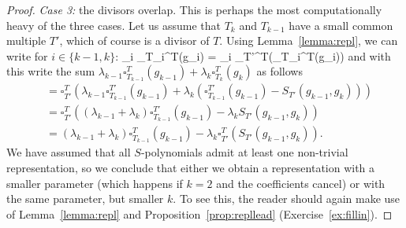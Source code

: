 \documentclass[fleqn, a4paper, twoside]{article}
\makeatletter
\newcommand{\repl}[3]{\square_{#1}^{#2}(#3)}
\newcommand{\0}{\langle 0\rangle}
\let\[\@undefined
\DeclareRobustCommand{\[}{\begin{equation}}%
\let\]\@undefined
\DeclareRobustCommand{\]}{\end{equation}}%
\theoremstyle{mytheorem}
\theoremstyle{introthm}
\theoremstyle{mydefinition}
\theoremstyle{mydefinition2}
\theoremstyle{plain} %
\newcommand{\?}{\,?\,}
\theoremstyle{mytheorem}
\theoremstyle{plain} %
\makeatother
\begin{document}
\begin{proof}
\emph{Case 3:} the divisors overlap. This is perhaps the
most computationally heavy of the three cases. Let us
assume that $T_k$ and $T_{k-1}$ have a small common
multiple $T'$, which of course is a divisor of $T$.
Using Lemma~\ref{lemma:repl}, we can write
for $i\in \{k-1,k\}$:
\[
\lambda_i \repl{T_i}{T}{g_i}  = 
\lambda_i \repl{T'}{T}{\repl{T_i}{T}{g_i}}
\]
and with this write the sum $\lambda_{k-1}\repl{T_{k-1}}{T}{g_{k-1}} +  \lambda_k\repl{T_{k}}{T}{g_{k}}$ as follows
\begin{align*}
 {} &= 
\repl{T'}{T}{\lambda_{k-1}\repl{T_{k-1}}{T'}{g_{k-1}} + 
  \lambda_k (\repl{T_{k-1}}{T'}{g_{k-1}} - S_{T'}(g_{k-1},g_k))} \\
  &=
  	\repl{T'}{T}{(\lambda_{k-1}+\lambda_k)
  		\repl{T_{k-1}}{T'}{g_{k-1}} 
  -   \lambda_k S_{T'}(g_{k-1},g_k)} \\
  &=
  	(\lambda_{k-1}+\lambda_k)
  		\repl{T_{k-1}}{T}{g_{k-1}} 
  -   \lambda_k \repl{T'}{T}{S_{T'}(g_{k-1},g_k)}.
\end{align*}
We have assumed that all $S$-polynomials admit at least
one non-trivial representation, so we conclude that either
we obtain a representation with a smaller parameter
(which happens if $k=2$ and the coefficients cancel)
or with the same parameter, but smaller $k$. To see
this, the reader should again make use of 
Lemma~\ref{lemma:repl}
and Proposition~\ref{prop:repllead} (Exercise~\ref{ex:fillin}).
\end{proof}
\end{document}
